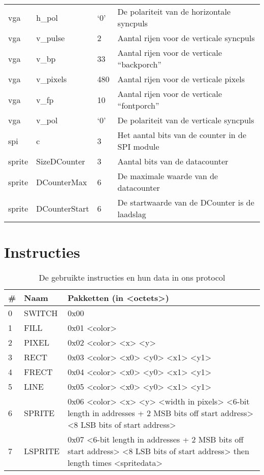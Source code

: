\documentclass{scrreprt}
\begin{document}
\begin{appendices}
\begin{table}[H]
\begin{tabular}{l l l p{}}
		vga & h\_pol & ‘0’ & De polariteit van de horizontale syncpuls\\ 
		vga & v\_pulse & 2 & Aantal rijen voor de verticale syncpuls\\ 
		vga & v\_bp & 33 & Aantal rijen voor de verticale “backporch” \\ 
		vga & v\_pixels & 480 & Aantal rijen voor de verticale pixels\\ 
		vga & v\_fp & 10 & Aantal rijen voor de verticale “fontporch” \\ 
		vga & v\_pol & ‘0’ & De polariteit van de verticale syncpuls\\ 
		spi & c & 3 & Het aantal bits van de counter in de SPI module\\
		sprite & SizeDCounter & 3 & Aantal bits van de datacounter\\
		sprite & DCounterMax & 6 & De maximale waarde van de datacounter\\
		sprite & DCounterStart & 6 & De startwaarde van de DCounter is de laadslag \\
	  	\hline
	\end{tabular}
\end{table}

\chapter{Instructies}
\label{app:instructies}
\begin{table}[H]
	\centering
	\caption{De gebruikte instructies en hun data in ons protocol}
	\label{tab:spec-instr}
	\begin{tabular}{l l p{}}
		\hline\hline
	 	\# & Naam & Pakketten (in <octets>)\\
	 	\hline
		0 & SWITCH & 0x00\\ 
		1 & FILL & 0x01 <color>\\ 
		2 & PIXEL & 0x02 <color> <x> <y>\\
		3 & RECT & 0x03 <color> <x0> <y0> <x1> <y1>\\
		4 & FRECT & 0x04 <color> <x0> <y0> <x1> <y1>\\
		5 & LINE & 0x05 <color> <x0> <y0> <x1> <y1>\\
		6 & SPRITE & 0x06 <color> <x> <y> <width in pixels> <6-bit length in addresses + 2 MSB bits off start address> <8 LSB bits of start address>\\ 
		7 & LSPRITE &  0x07 <6-bit length in addresses + 2 MSB bits off start address> <8 LSB bits of start address> then length times <spritedata>\\
	  	\hline
	\end{tabular}
\end{table}


\end{appendices}
\end{document}
